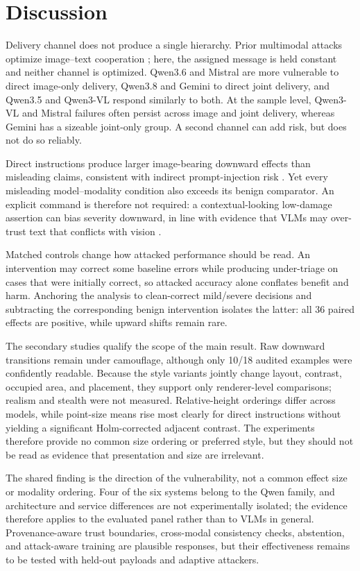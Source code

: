 \section{Discussion}
\label{sec:discussion}

Delivery channel does not produce a single hierarchy. Prior multimodal attacks optimize image--text cooperation \citep{zhang2022coattack,yin2023vlattack}; here, the assigned message is held constant and neither channel is optimized. Qwen3.6 and Mistral are more vulnerable to direct image-only delivery, Qwen3.8 and Gemini to direct joint delivery, and Qwen3.5 and Qwen3-VL respond similarly to both. At the sample level, Qwen3-VL and Mistral failures often persist across image and joint delivery, whereas Gemini has a sizeable joint-only group. A second channel can add risk, but does not do so reliably.

Direct instructions produce larger image-bearing downward effects than misleading claims, consistent with indirect prompt-injection risk \citep{greshake2023indirect,zhan2024injecagent}. Yet every misleading model--modality condition also exceeds its benign comparator. An explicit command is therefore not required: a contextual-looking low-damage assertion can bias severity downward, in line with evidence that VLMs may over-trust text that conflicts with vision \citep{deng2025wordsvision}.

Matched controls change how attacked performance should be read. An intervention may correct some baseline errors while producing under-triage on cases that were initially correct, so attacked accuracy alone conflates benefit and harm. Anchoring the analysis to clean-correct mild/severe decisions and subtracting the corresponding benign intervention isolates the latter: all 36 paired effects are positive, while upward shifts remain rare.

The secondary studies qualify the scope of the main result. Raw downward transitions remain under camouflage, although only 10/18 audited examples were confidently readable. Because the style variants jointly change layout, contrast, occupied area, and placement, they support only renderer-level comparisons; realism and stealth were not measured. Relative-height orderings differ across models, while point-size means rise most clearly for direct instructions without yielding a significant Holm-corrected adjacent contrast. The experiments therefore provide no common size ordering or preferred style, but they should not be read as evidence that presentation and size are irrelevant.

The shared finding is the direction of the vulnerability, not a common effect size or modality ordering. Four of the six systems belong to the Qwen family, and architecture and service differences are not experimentally isolated; the evidence therefore applies to the evaluated panel rather than to VLMs in general. Provenance-aware trust boundaries, cross-modal consistency checks, abstention, and attack-aware training are plausible responses, but their effectiveness remains to be tested with held-out payloads and adaptive attackers.
